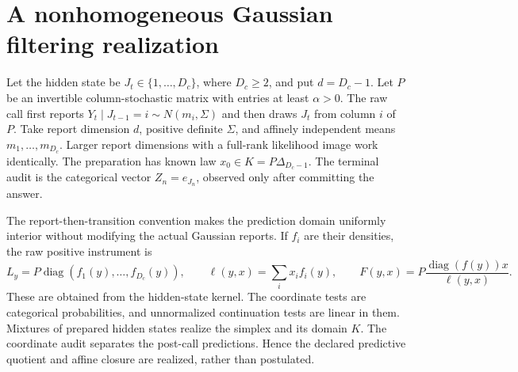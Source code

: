 \section{A nonhomogeneous Gaussian filtering realization}\label{sec:classical}
Let the hidden state be $J_t\in\{1,\ldots,D_c\}$, where $D_c\ge2$, and put $d=D_c-1$. Let $P$ be an invertible column-stochastic matrix with entries at least $\alpha>0$. The raw call first reports $Y_t\mid J_{t-1}=i\sim N(m_i,\Sigma)$ and then draws $J_t$ from column $i$ of $P$. Take report dimension $d$, positive definite $\Sigma$, and affinely independent means $m_1,\ldots,m_{D_c}$. Larger report dimensions with a full-rank likelihood image work identically. The preparation has known law $x_0\in K=P\Delta_{D_c-1}$. The terminal audit is the categorical vector $Z_n=e_{J_n}$, observed only after committing the answer.

The report-then-transition convention makes the prediction domain uniformly interior without modifying the actual Gaussian reports. If $f_i$ are their densities, the raw positive instrument is
\begin{equation}\label{eq:gaussian-instrument}
 L_y=P\operatorname{diag}(f_1(y),\ldots,f_{D_c}(y)),\qquad
 \ell(y,x)=\sum_i x_i f_i(y),\qquad
 F(y,x)=P\frac{\operatorname{diag}(f(y))x}{\ell(y,x)}.
\end{equation}
These are obtained from the hidden-state kernel. The coordinate tests are categorical probabilities, and unnormalized continuation tests are linear in them. Mixtures of prepared hidden states realize the simplex and its domain $K$. The coordinate audit separates the post-call predictions. Hence the declared predictive quotient and affine closure are realized, rather than postulated.

